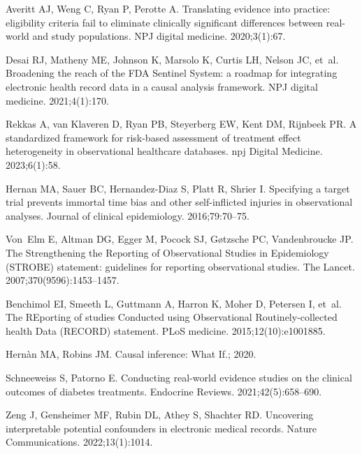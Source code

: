 \documentclass[10pt,letterpaper]{article}
\begin{document}
\begin{thebibliography}{100}
  Averitt AJ, Weng C, Ryan P, Perotte A.
  \newblock Translating evidence into practice: eligibility criteria fail to eliminate clinically significant differences between real-world and study populations.
  \newblock NPJ digital medicine. 2020;3(1):67.

  Desai RJ, Matheny ME, Johnson K, Marsolo K, Curtis LH, Nelson JC, et~al.
  \newblock Broadening the reach of the FDA Sentinel System: a roadmap for integrating electronic health record data in a causal analysis framework.
  \newblock NPJ digital medicine. 2021;4(1):170.

  Rekkas A, van Klaveren D, Ryan PB, Steyerberg EW, Kent DM, Rijnbeek PR.
  \newblock A standardized framework for risk-based assessment of treatment effect heterogeneity in observational healthcare databases.
  \newblock npj Digital Medicine. 2023;6(1):58.

  Hernan MA, Sauer BC, Hernandez-Diaz S, Platt R, Shrier I.
  \newblock Specifying a target trial prevents immortal time bias and other self-inflicted injuries in observational analyses.
  \newblock Journal of clinical epidemiology. 2016;79:70--75.

  Von~Elm E, Altman DG, Egger M, Pocock SJ, G{\o}tzsche PC, Vandenbroucke JP.
  \newblock The Strengthening the Reporting of Observational Studies in Epidemiology (STROBE) statement: guidelines for reporting observational studies.
  \newblock The Lancet. 2007;370(9596):1453--1457.

  Benchimol EI, Smeeth L, Guttmann A, Harron K, Moher D, Petersen I, et~al.
  \newblock The REporting of studies Conducted using Observational Routinely-collected health Data (RECORD) statement.
  \newblock PLoS medicine. 2015;12(10):e1001885.

  Hernàn MA, Robins JM.
  \newblock Causal inference: What If.; 2020.

  Schneeweiss S, Patorno E.
  \newblock Conducting real-world evidence studies on the clinical outcomes of diabetes treatments.
  \newblock Endocrine Reviews. 2021;42(5):658--690.

  Zeng J, Gensheimer MF, Rubin DL, Athey S, Shachter RD.
  \newblock Uncovering interpretable potential confounders in electronic medical records.
  \newblock Nature Communications. 2022;13(1):1014.


\end{thebibliography}
\end{document}
